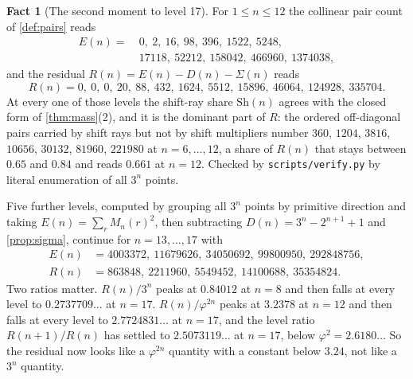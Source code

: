 \documentclass[11pt]{amsart}
\theoremstyle{definition}
\newtheorem{fact}[theorem]{Fact}
\theoremstyle{remark}
\begin{document}
\begin{fact}[The second moment to level 17]
\label{fact:second}
For $1\le n\le 12$ the collinear pair count of \cref{def:pairs} reads
\[
\begin{aligned}
E(n)=\ &0,\ 2,\ 16,\ 98,\ 396,\ 1522,\ 5248,\\
&17118,\ 52212,\ 158042,\ 466960,\ 1374038 ,
\end{aligned}
\]
and the residual $R(n)=E(n)-D(n)-\Sigma(n)$ reads
\[
R(n)=0,\ 0,\ 0,\ 20,\ 88,\ 432,\ 1624,\ 5512,\ 15896,\ 46064,\ 124928,\ 335704 .
\]
At every one of those levels the shift-ray share $\mathrm{Sh}(n)$ agrees with the closed form of \cref{thm:mass}(2), and it is the dominant part of $R$: the ordered off-diagonal pairs carried by shift rays but not by shift multipliers number $360$, $1204$, $3816$, $10656$, $30132$, $81960$, $221980$ at $n=6,\dots,12$, a share of $R(n)$ that stays between $0.65$ and $0.84$ and reads $0.661$ at $n=12$. Checked by \texttt{scripts/verify.py} by literal enumeration of all $3^n$ points.

Five further levels, computed by grouping all $3^n$ points by primitive direction and taking $E(n)=\sum_r M_n(r)^2$, then subtracting $D(n)=3^n-2^{n+1}+1$ and \cref{prop:sigma}, continue for $n=13,\dots,17$ with
\[
\begin{aligned}
E(n)&=4003372,\ 11679626,\ 34050692,\ 99800950,\ 292848756,\\
R(n)&=863848,\ 2211960,\ 5549452,\ 14100688,\ 35354824 .
\end{aligned}
\]
Two ratios matter. $R(n)/3^n$ peaks at $0.84012$ at $n=8$ and then falls at every level to $0.2737709\ldots$ at $n=17$. $R(n)/\varphi^{2n}$ peaks at $3.2378$ at $n=12$ and then falls at every level to $2.7724831\ldots$ at $n=17$, and the level ratio $R(n+1)/R(n)$ has settled to $2.5073119\ldots$ at $n=17$, below $\varphi^2=2.6180\ldots$ So the residual now looks like a $\varphi^{2n}$ quantity with a constant below $3.24$, not like a $3^n$ quantity.
\end{fact}
\end{document}
